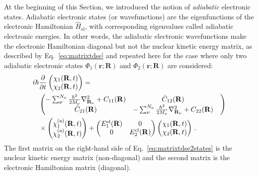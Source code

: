 \documentclass[9pt,bestpractices]{livecoms}
\newcommand{\bs}{\mathbf}
\begin{document}
At the beginning of this Section, we introduced the notion of \textit{adiabatic} electronic states. Adiabatic electronic states (or wavefunctions) are the eigenfunctions of the electronic Hamiltonian $\hat{H}_{\text{el}}$, with corresponding eigenvalues called adiabatic electronic energies. In other words, the adiabatic electronic wavefunctions make the electronic Hamiltonian diagonal but not the nuclear kinetic energy matrix, as described by Eq.~\ref{eq:matrixtdse} and repeated here for the case where only two adiabatic electronic states $\Phi_1(\bs r; \bs R)$ and $\Phi_2(\bs r; \bs R)$ are considered:
\begin{align} 
 i\hbar & \frac{\partial}{\partial t} 
     \begin{pmatrix}
        \chi_1(\mathbf{R},t)  \\
        \chi_2(\mathbf{R},t) \\
    \end{pmatrix} =  \notag \\
   & \begin{pmatrix}
        -\sum_\nu^{N_{\text{n}}}\frac{\hbar^2}{2M_\nu} \nabla_{\mathbf{R}_\nu}^2 + C_{11}(\mathbf{R})  & \hat{C}_{12}(\mathbf{R})  \\
        \hat{C}_{21}(\mathbf{R}) & -\sum_\nu^{N_{\text{n}}}\frac{\hbar^2}{2M_\nu} \nabla_{\mathbf{R}_\nu}^2 + C_{22}(\mathbf{R}) & \\
    \end{pmatrix}  \notag \\
    & \times \begin{pmatrix}
        \chi_1^{\text{(a)}}(\mathbf{R},t)  \\
        \chi_2^{\text{(a)}}(\mathbf{R},t) \\
    \end{pmatrix} + 
    \begin{pmatrix}
        E^{\text{el}}_{1}(\mathbf{R})   & 0  \\
        0 & E^{\text{el}}_{2}(\mathbf{R})    \\
    \end{pmatrix} 
    \begin{pmatrix}
        \chi_1(\mathbf{R},t)  \\
        \chi_2(\mathbf{R},t) \\
    \end{pmatrix}
    \, .
\label{eq:matrixtdse2states}
\end{align}
The first matrix on the right-hand side of Eq.~\eqref{eq:matrixtdse2states} is the nuclear kinetic energy matrix (non-diagonal) and the second matrix is the electronic Hamiltonian matrix (diagonal).
\end{document}
